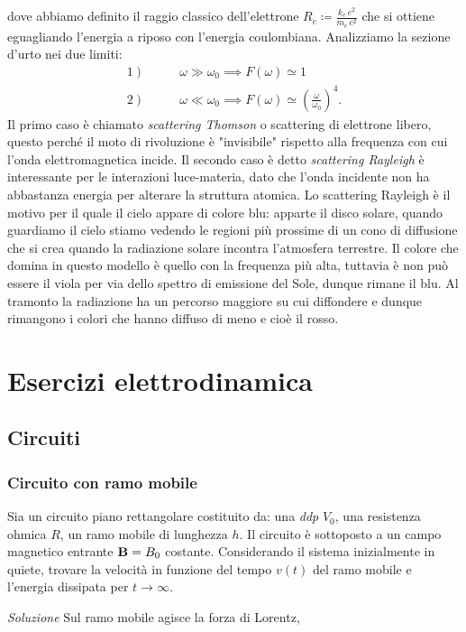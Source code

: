 dove abbiamo definito il raggio classico dell'elettrone $ R_e \coloneq \frac{k_e\,e^2}{m_e\,c^2} $ che si ottiene eguagliando l'energia a riposo 
con l'energia coulombiana. Analizziamo la sezione d'urto nei due limiti: 
\begin{align}
  \left.1\right)\qquad &\omega \gg \omega_0 \implies F(\omega) \simeq 1
  \\
  \left.2\right)\qquad &\omega \ll \omega_0 \implies F(\omega) \simeq \left( \frac{\omega}{\omega_0} \right)^4.
\end{align}
Il primo caso è chiamato \textit{scattering Thomson} o scattering di elettrone libero, questo perché il moto di rivoluzione è "invisibile" rispetto alla 
frequenza con cui l'onda elettromagnetica incide. Il secondo caso è detto \textit{scattering Rayleigh} è interessante per le interazioni luce-materia, 
dato che l'onda incidente non ha abbastanza energia per alterare la struttura atomica. Lo scattering Rayleigh è il motivo per il quale il cielo appare di 
colore blu: apparte il disco solare, quando guardiamo il cielo stiamo vedendo le regioni più prossime di un cono di diffusione che si crea quando la 
radiazione solare incontra l'atmosfera terrestre. Il colore che domina in questo modello è quello con la frequenza più alta, tuttavia è non può essere il 
viola per via dello spettro di emissione del Sole, dunque rimane il blu. Al tramonto la radiazione ha un percorso maggiore su cui diffondere e dunque 
rimangono i colori che hanno diffuso di meno e cioè il rosso.

\chapter{Esercizi elettrodinamica}
\section{Circuiti}
\subsection{Circuito con ramo mobile}
Sia un circuito piano rettangolare costituito da: una \textit{ddp} $ V_0 $, una resistenza ohmica $ R $, un ramo mobile di lunghezza $ h $.
Il circuito è sottoposto a un campo magnetico entrante $ \mathbf{ B } = B_0 $ costante. Considerando il sistema inizialmente in quiete, trovare la 
velocità in funzione del tempo $ v(t) $ del ramo mobile e l'energia dissipata per $ t \to \infty $.

\textit{Soluzione} 
Sul ramo mobile agisce la forza di Lorentz,

